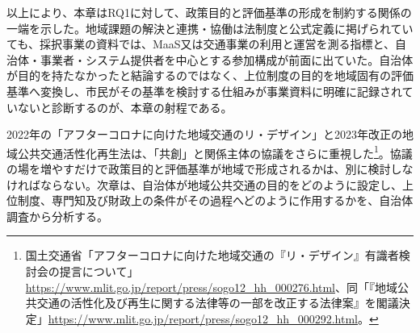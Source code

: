 以上により、本章はRQ1に対して、政策目的と評価基準の形成を制約する関係の一端を示した。地域課題の解決と連携・協働は法制度と公式定義に掲げられていても、採択事業の資料では、MaaS又は交通事業の利用と運営を測る指標と、自治体・事業者・システム提供者を中心とする参加構成が前面に出ていた。自治体が目的を持たなかったと結論するのではなく、上位制度の目的を地域固有の評価基準へ変換し、市民がその基準を検討する仕組みが事業資料に明確に記録されていないと診断するのが、本章の射程である。

2022年の「アフターコロナに向けた地域交通のリ・デザイン」と2023年改正の地域公共交通活性化再生法は、「共創」と関係主体の協議をさらに重視した\footnote{国土交通省「アフターコロナに向けた地域交通の『リ・デザイン』有識者検討会の提言について」\url{https://www.mlit.go.jp/report/press/sogo12_hh_000276.html}、同「『地域公共交通の活性化及び再生に関する法律等の一部を改正する法律案』を閣議決定」\url{https://www.mlit.go.jp/report/press/sogo12_hh_000292.html}。}。協議の場を増やすだけで政策目的と評価基準が地域で形成されるかは、別に検討しなければならない。次章は、自治体が地域公共交通の目的をどのように設定し、上位制度、専門知及び財政上の条件がその過程へどのように作用するかを、自治体調査から分析する。

\printbibliography[heading=subbibliography,title={章末参考文献}]
